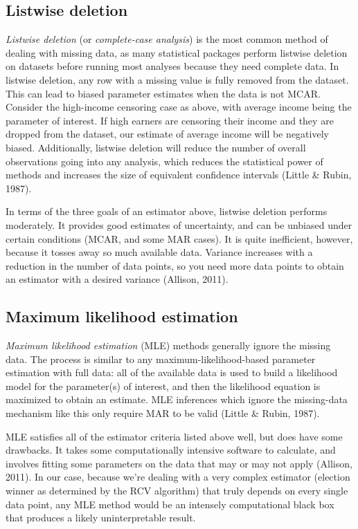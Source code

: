 \documentclass[12pt,twoside]{reedthesis}
\begin{document}
\hypertarget{listwise-deletion}{%
\subsection{Listwise deletion}\label{listwise-deletion}}

\emph{Listwise deletion} (or \emph{complete-case analysis}) is the most common method of dealing with missing data, as many statistical packages perform listwise deletion on datasets before running most analyses because they need complete data. In listwise deletion, any row with a missing value is fully removed from the dataset. This can lead to biased parameter estimates when the data is not MCAR. Consider the high-income censoring case as above, with average income being the parameter of interest. If high earners are censoring their income and they are dropped from the dataset, our estimate of average income will be negatively biased. Additionally, listwise deletion will reduce the number of overall observations going into any analysis, which reduces the statistical power of methods and increases the size of equivalent confidence intervals (Little \& Rubin, 1987).

In terms of the three goals of an estimator above, listwise deletion performs moderately. It provides good estimates of uncertainty, and can be unbiased under certain conditions (MCAR, and some MAR cases). It is quite inefficient, however, because it tosses away so much available data. Variance increases with a reduction in the number of data points, so you need more data points to obtain an estimator with a desired variance (Allison, 2011).

\hypertarget{maximum-likelihood-estimation}{%
\subsection{Maximum likelihood estimation}\label{maximum-likelihood-estimation}}

\emph{Maximum likelihood estimation} (MLE) methods generally ignore the missing data. The process is similar to any maximum-likelihood-based parameter estimation with full data: all of the available data is used to build a likelihood model for the parameter(s) of interest, and then the likelihood equation is maximized to obtain an estimate. MLE inferences which ignore the missing-data mechanism like this only require MAR to be valid (Little \& Rubin, 1987).

MLE satisfies all of the estimator criteria listed above well, but does have some drawbacks. It takes some computationally intensive software to calculate, and involves fitting some parameters on the data that may or may not apply (Allison, 2011). In our case, because we're dealing with a very complex estimator (election winner as determined by the RCV algorithm) that truly depends on every single data point, any MLE method would be an intensely computational black box that produces a likely uninterpretable result.
\end{document}
